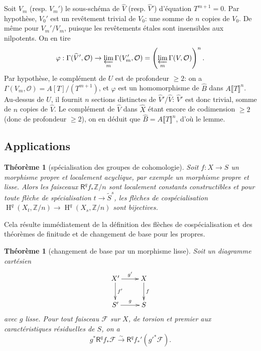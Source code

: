 \documentclass{book}
\DeclareMathOperator{\h}{H}
\newcommand{\cF}{\mathcal{F}}
\newcommand{\cO}{\mathcal{O}}
\newcommand{\dZ}{\mathbb{Z}}
\newcommand{\iso}{\xrightarrow\sim}
\newcommand{\R}{\mathsf{R}}
\newtheorem{theorem}[subsubsection]{Théorème}
\begin{document}
Soit $V_m$ (resp. $V_m'$) le sous-schéma de $\widehat V$ (resp. $\widehat V'$) 
d'équation $T^{m+1} = 0$. Par hypothèse, $V_0'$ est un revêtement trivial 
de $V_0$: une somme de $n$ copies de $V_0$. De même pour $V_m'/V_m$, puisque 
les revêtements étales sont insensibles aux nilpotents. On en tire 
\[
  \varphi : \Gamma(\widehat V',\cO) \to \varprojlim_m \Gamma(V_m',\cO) = \left(\varprojlim_m \Gamma(V,\cO)\right)^n \text{.}
\]
Par hypothèse, le complément de $U$ est de profondeur $\geqslant 2$: on a 
$\Gamma(V_m,\cO)=A[T]/(T^{m+1})$, et $\varphi$ est un homomorphisme de 
$\widehat B$ dans $A\llbracket T\rrbracket^n$. Au-dessus de $U$, il fournit $n$ 
sections distinctes de $\widehat V'/\widehat V$: $\widehat V'$ est donc trivial, 
somme de $n$ copies de $\widehat V$. Le complément de $\widehat V$ dans 
$\widehat X$ étant encore de codimension $\geqslant 2$ (donc de profondeur 
$\geqslant 2$), on en déduit que $\widehat B=A\llbracket T\rrbracket^n$, 
d'où le lemme. 










\subsection{Applications}\label{I:5-3}





\begin{theorem}[spécialisation des groupes de cohomologie]\label{I:5-3-1}
Soit $f:X\to S$ un morphisme propre et localement acyclique, par exemple un 
morphisme propre et lisse. Alors les faisceaux $\R^q f_*\dZ/n$ sont localement 
constants constructibles et pour toute flèche de spécialisation 
$t\to\widetilde S^s$, les flèches de cospécialisation 
$\h^q(X_t,\dZ/n)\to\h^q(X_s,\dZ/n)$ sont bijectives.
\end{theorem}

Cela résulte immédiatement de la définition des flèches de 
cospécialisation et des théorèmes de finitude et de changement de base pour 
les propres. 





\begin{theorem}[changement de base par un morphisme lisse]\label{I:5-3-2}
Soit un diagramme cartésien 
\[\xymatrix{
  X' \ar[r]^-{g'} \ar[d]^-{f'} 
    & X \ar[d]^-f \\
  S' \ar[r]^-{g} 
    & S
}\]
avec $g$ lisse. Pour tout faisceau $\cF$ sur $X$, de torsion et premier aux 
caractéristiques résiduelles de $S$, on a 
\[
  g^* \R^q f_* \cF \iso \R^q f_*'({g'}^* \cF) \text{.}
\]
\end{theorem}
\end{document}
